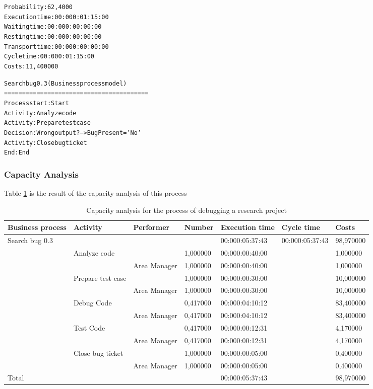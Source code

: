 \begin{alltt}
Probability:   62,4000%
Execution time:  00:000:01:15:00
Waiting time:  00:000:00:00:00
Resting time:  00:000:00:00:00
Transport time:  00:000:00:00:00
Cycle time:  00:000:01:15:00
Costs:  11,400000

Search bug 0.3 (Business process model)
========================================
Process start: Start
Activity: Analyze code
Activity: Prepare test case
Decision: Wrong output? --> BugPresent = 'No'
Activity: Close bug ticket
End: End
\end{alltt}

\subsubsection{Capacity Analysis}
Table \ref{2tab:debug} is the result of the capacity analysis of this
process
\begin{landscape}
\centering
\begin{table}
{\tiny
\begin{tabular}{|l|l|l|l|l|l|l|}
Business process&Activity&Performer&Number&Execution time&Cycle
time&Costs\\
\hline
Search bug 0.3&&&&00:000:05:37:43&00:000:05:37:43&98,970000\\
\hline
&Analyze code &&1,000000&00:000:00:40:00&&1,000000\\
\hline
&&Area Manager &1,000000&00:000:00:40:00&&1,000000\\
\hline
&Prepare test case &&1,000000&00:000:00:30:00&&10,000000\\
\hline
&&Area Manager &1,000000&00:000:00:30:00&&10,000000\\
\hline
&Debug Code &&0,417000&00:000:04:10:12&&83,400000\\
\hline
&&Area Manager &0,417000&00:000:04:10:12&&83,400000\\
\hline
&Test Code &&0,417000&00:000:00:12:31&&4,170000\\
\hline
&&Area Manager &0,417000&00:000:00:12:31&&4,170000\\
\hline
&Close bug ticket &&1,000000&00:000:00:05:00&&0,400000\\
\hline
&&Area Manager &1,000000&00:000:00:05:00&&0,400000\\
\hline
Total&&&&00:000:05:37:43&&98,970000\\
\hline
\end{tabular}
}
\caption{Capacity analysis for the process of debugging a research project} 
\label{2tab:debug}
\end{table}
\end{landscape}



